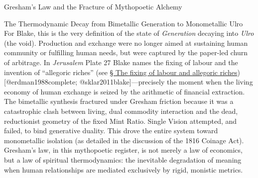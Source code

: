\documentclass[
  ignorenonframetext,
]{beamer}
\begin{document}
\begin{frame}{Gresham's Law and the Fracture of Mythopoetic Alchemy}
\begin{block}{The Thermodynamic Decay from Bimetallic Generation to
Monometallic Ulro}
For Blake, this is the very definition of the state of \emph{Generation}
decaying into \emph{Ulro} (the void). Production and exchange were no
longer aimed at sustaining human community or fulfilling human needs,
but were captured by the paper-led churn of arbitrage. In
\emph{Jerusalem} Plate 27 Blake names the fixing of labour and the
invention of ``allegoric riches'' (see
\hyperlink{sec-allegoric-riches}{§ The fixing of labour and allegoric
riches}) {[}@erdman1988complete; @sklar2011blake{]}---precisely the
moment when the living economy of human exchange is seized by the
arithmetic of financial extraction. The bimetallic synthesis fractured
under Gresham friction because it was a catastrophic clash between
living, dual commodity interaction and the dead, reductionist geometry
of the fixed Mint Ratio. Single Vision attempted, and failed, to bind
generative duality. This drove the entire system toward monometallic
isolation (as detailed in the discussion of the 1816 Coinage Act).
Gresham's law, in this mythopoetic register, is not merely a law of
economics, but a law of spiritual thermodynamics: the inevitable
degradation of meaning when human relationships are mediated exclusively
by rigid, monistic metrics.


\end{block}
\end{frame}
\end{document}
